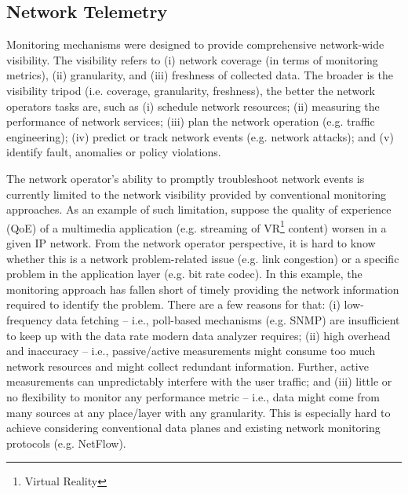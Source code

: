 
\subsection{Network Telemetry}

Monitoring mechanisms were designed to provide comprehensive network-wide visibility. The visibility refers to (i) network coverage (in terms of monitoring metrics), (ii) granularity, and (iii) freshness of collected data. The broader is the visibility tripod (i.e. coverage, granularity, freshness), the better the network operators tasks are, such as (i) schedule network resources; (ii) measuring the performance of network services; (iii) plan the network operation (e.g. traffic engineering); (iv) predict or track network events (e.g. network attacks); and (v) identify fault, anomalies or policy violations.

The network operator's ability to promptly troubleshoot network events is currently limited to the network visibility provided by conventional monitoring approaches. As an example of such limitation, suppose the quality of experience (QoE) of a multimedia application (e.g. streaming of VR\footnote{Virtual Reality} content) worsen in a given IP network. From the network operator perspective, it is hard to know whether this is a network problem-related issue (e.g. link congestion) or a specific problem in the application layer (e.g. bit rate codec).  
%
In this example, the monitoring approach has fallen short of timely providing the network information required to identify the problem. 
%
There are a few reasons for that: (i) low-frequency data fetching -- i.e., poll-based mechanisms (e.g. SNMP) are insufficient to keep up with the data rate modern data analyzer requires; (ii) high overhead and inaccuracy -- i.e., passive/active measurements might consume too much network resources and might collect redundant information. Further, active measurements can unpredictably interfere with the user traffic; and (iii) little or no flexibility to monitor any performance metric -- i.e., data might come from many sources at any place/layer with any granularity. This is especially hard to achieve considering conventional data planes and existing network monitoring protocols (e.g. NetFlow). 

